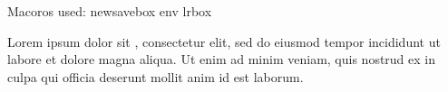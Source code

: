 \documentclass{article}
\begin{document}
{Macoros used: newsavebox env lrbox}

\newsavebox{\testbox}
\newenvironment{clozeexample}{%
  \noindent%
  \begin{lrbox}{\testbox}%
  \begin{minipage}{\textwidth}%
  \footnotesize%
}{%
  \end{minipage}%
  \end{lrbox}%
  \begin{center}%
    \fbox{\usebox{\testbox}}%
  \end{center}%
}

\begin{clozeexample}
Lorem ipsum dolor sit , consectetur 
elit, sed do eiusmod tempor incididunt ut labore et dolore magna aliqua.
Ut enim ad minim veniam, quis nostrud ex  in culpa
qui officia deserunt mollit anim id est laborum.
\end{clozeexample}
\end{document}
